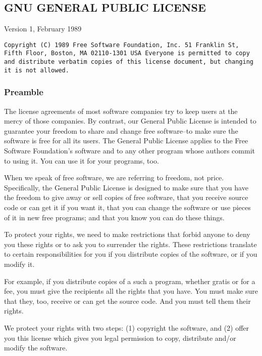 \documentclass[]{article}
\date{}
\begin{document}
\subsection{GNU GENERAL PUBLIC LICENSE}

Version 1, February 1989

\begin{verbatim}
Copyright (C) 1989 Free Software Foundation, Inc. 51 Franklin St,
Fifth Floor, Boston, MA 02110-1301 USA Everyone is permitted to copy
and distribute verbatim copies of this license document, but changing
it is not allowed.
\end{verbatim}

\subsubsection{Preamble}

The license agreements of most software companies try to keep users at
the mercy of those companies. By contrast, our General Public License is
intended to guarantee your freedom to share and change free software--to
make sure the software is free for all its users. The General Public
License applies to the Free Software Foundation's software and to any
other program whose authors commit to using it. You can use it for your
programs, too.

When we speak of free software, we are referring to freedom, not price.
Specifically, the General Public License is designed to make sure that
you have the freedom to give away or sell copies of free software, that
you receive source code or can get it if you want it, that you can
change the software or use pieces of it in new free programs; and that
you know you can do these things.

To protect your rights, we need to make restrictions that forbid anyone
to deny you these rights or to ask you to surrender the rights. These
restrictions translate to certain responsibilities for you if you
distribute copies of the software, or if you modify it.

For example, if you distribute copies of a such a program, whether
gratis or for a fee, you must give the recipients all the rights that
you have. You must make sure that they, too, receive or can get the
source code. And you must tell them their rights.

We protect your rights with two steps: (1) copyright the software, and
(2) offer you this license which gives you legal permission to copy,
distribute and/or modify the software.
\end{document}
